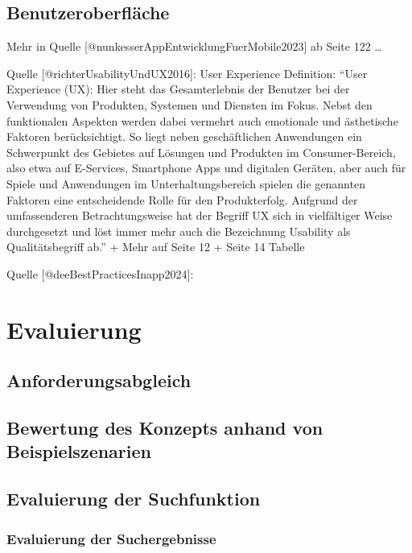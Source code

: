 \documentclass[
  12pt,
  a4paperpaper,
]{report}
\begin{document}
\section{Benutzeroberfläche}\label{benutzeroberfluxe4che}

Mehr in Quelle {[}@nunkesserAppEntwicklungFuerMobile2023{]} ab Seite 122
\ldots{}

Quelle {[}@richterUsabilityUndUX2016{]}: User Experience Definition:
``User Experience (UX): Hier steht das Gesamterlebnis der Benutzer bei
der Verwendung von Produkten, Systemen und Diensten im Fokus. Nebst den
funktionalen Aspekten werden dabei vermehrt auch emotionale und
ästhetische Faktoren berücksichtigt. So liegt neben geschäftlichen
Anwendungen ein Schwerpunkt des Gebietes auf Lösungen und Produkten im
Consumer-Bereich, also etwa auf E-Services, Smartphone Apps und
digitalen Geräten, aber auch für Spiele und Anwendungen im
Unterhaltungsbereich spielen die genannten Faktoren eine entscheidende
Rolle für den Produkterfolg. Aufgrund der umfassenderen
Betrachtungsweise hat der Begriff UX sich in vielfältiger Weise
durchgesetzt und löst immer mehr auch die Bezeichnung Usability als
Qualitätsbegriff ab.'' + Mehr auf Seite 12 + Seite 14 Tabelle

Quelle {[}@deeBestPracticesInapp2024{]}:

\chapter{Evaluierung}\label{evaluierung}

\section{Anforderungsabgleich}\label{anforderungsabgleich}

\section{Bewertung des Konzepts anhand von
Beispielszenarien}\label{bewertung-des-konzepts-anhand-von-beispielszenarien}

\section{Evaluierung der
Suchfunktion}\label{evaluierung-der-suchfunktion}

\subsection{Evaluierung der
Suchergebnisse}\label{evaluierung-der-suchergebnisse}
\end{document}

